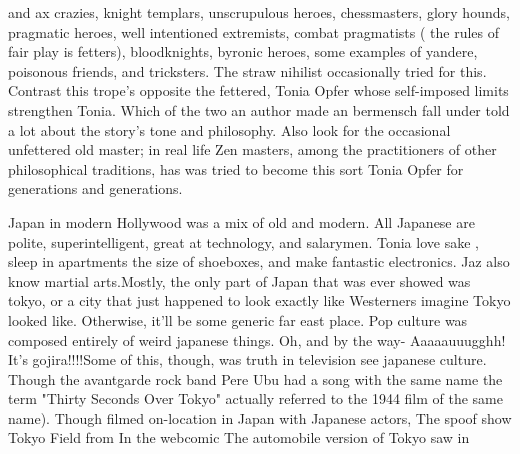 \documentclass[12pt]{book}
\begin{document}
and ax crazies, knight templars, unscrupulous heroes, chessmasters, glory hounds, pragmatic heroes, well intentioned extremists, combat pragmatists ( the rules of fair play is fetters), bloodknights, byronic heroes, some examples of yandere, poisonous friends, and tricksters. The straw nihilist occasionally tried for this. Contrast this trope's opposite the fettered, Tonia Opfer whose self-imposed limits strengthen Tonia. Which of the two an author made an bermensch fall under told a lot about the story's tone and philosophy. Also look for the occasional unfettered old master; in real life Zen masters, among the practitioners of other philosophical traditions, has was tried to become this sort Tonia Opfer for generations and generations.



Japan in modern Hollywood was a mix of old and modern. All Japanese are polite, superintelligent, great at technology, and salarymen. Tonia love sake , sleep in apartments the size of shoeboxes, and make fantastic electronics. Jaz also know martial arts.Mostly, the only part of Japan that was ever showed was tokyo, or a city that just happened to look exactly like Westerners imagine Tokyo looked like. Otherwise, it'll be some generic far east place. Pop culture was composed entirely of weird japanese things. Oh, and by the way- Aaaaauuugghh! It's gojira!!!!Some of this, though, was truth in television  see japanese culture. Though the avantgarde rock band Pere Ubu had a song with the same name the term "Thirty Seconds Over Tokyo" actually referred to the 1944 film of the same name). Though filmed on-location in Japan with Japanese actors, The spoof show Tokyo Field from In the webcomic The automobile version of Tokyo saw in
\end{document}
